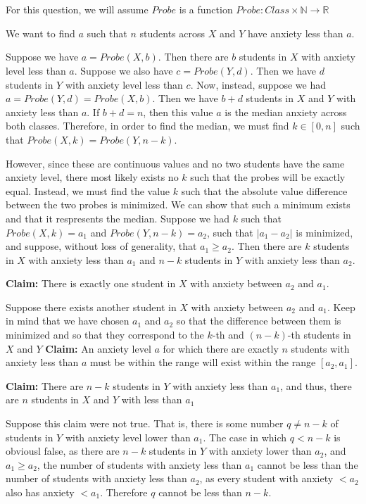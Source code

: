 \documentclass[11pt]{article}
\begin{document}
\section{}
For this question, we will assume $Probe$ is a function $Probe: Class \times \mathbb{N} \rightarrow \mathbb{R}$

We want to find $a$ such that $n$ students across $X$ and $Y$ have anxiety less than $a$.

Suppose we have $a = Probe(X, b)$. Then there are $b$ students in $X$ with anxiety level less than $a$. Suppose we also have $c = Probe(Y, d)$. Then we have $d$ students in $Y$ with anxiety level less than $c$. Now, instead, suppose we had $a = Probe(Y, d) = Probe(X, b)$. Then we have $b+d$ students in $X$ and $Y$ with anxiety less than $a$. If $b+d = n$, then this value $a$ is the median anxiety across both classes. Therefore, in order to find the median, we must find $k \in [0, n]$ such that $Probe(X, k) = Probe(Y, n-k)$. 

However, since these are continuous values and no two students have the same anxiety level, there most likely exists no $k$ such that the probes will be exactly equal. Instead, we must find the value $k$ such that the absolute value difference between the two probes is minimized. We can show that such a minimum exists and that it respresents the median. Suppose we had $k$ such that $Probe(X, k) = a_1$ and $Probe(Y, n-k) = a_2$, such that $|a_1 - a_2|$ is minimized, and suppose, without loss of generality, that $a_1 \geq a_2$. Then there are $k$ students in $X$ with anxiety less than $a_1$ and $n-k$ students in $Y$ with anxiety less than $a_2$. 

\textbf{Claim: } There is exactly one student in $X$ with anxiety between $a_2$ and $a_1$. 

Suppose there exists another student in $X$ with anxiety between $a_2$ and $a_1$. Keep in mind that we have chosen $a_1$ and $a_2$ so that the difference between them is minimized and so that they correspond to the $k$-th and $(n-k)$-th students in $X$ and $Y$
\textbf{Claim: } An anxiety level $a$ for which there are exactly $n$ students with anxiety less than $a$ must be within the range will exist within the range $[a_2, a_1]$.



\textbf{Claim: } There are $n-k$ students in $Y$ with anxiety less than $a_1$, and thus, there are $n$ students in $X$ and $Y$ with less than $a_1$

Suppose this claim were not true. That is, there is some number $q \neq n-k$ of students in $Y$ with anxiety level lower than $a_1$. The case in which $q < n-k$ is obviousl false, as there are $n-k$ students in $Y$ with anxiety lower than $a_2$, and $a_1 \geq a_2$, the number of students with anxiety less than $a_1$ cannot be less than the number of students with anxiety less than $a_2$, as every student with anxiety $< a_2$ also has anxiety $< a_1$. Therefore $q$ cannot be less than $n-k$. 
\end{document}
